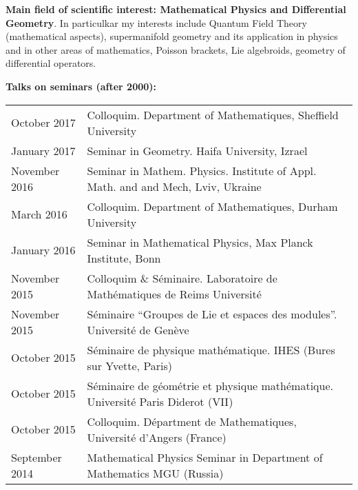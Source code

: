 \documentclass[12pt]{article}
\newcommand{\punkt}{\par\medskip\noindent}
\begin{document}
\medskip

   {\bf Main field of scientific interest: Mathematical Physics
   and Differential Geometry}. In particulkar  my interests 
  include Quantum Field Theory (mathematical aspects),
   supermanifold geometry and its application in physics and
  in other areas of mathematics, Poisson brackets, Lie algebroids,
geometry of differential operators.


 \punkt
 {\bf Talks on seminars (after 2000):}
 \par\smallskip\noindent
 \begin{tabular}{ll}

October  2017   &  Colloquim. Department of Mathematiques, 
Sheffield 
University \\


  January  2017   &  Seminar in Geometry.
 Haifa University, Izrael\\




November  2016   &  Seminar in Mathem. Physics.
 Institute of Appl. Math. and 
and Mech, Lviv, Ukraine \\



March  2016   &  Colloquim. Department of Mathematiques, Durham 
University \\


 January 2016   &Seminar in Mathematical Physics, Max Planck Institute, 
                      Bonn \\

 November 2015   & Colloquim \&
           S\'eminaire. Laboratoire 
        de Math\'ematiques de Reims 
             Universit\'e \\
 November 2015   & S\'eminaire ``Groupes de Lie et espaces des modules''.
             Universit\'e de Gen\`eve\\
 October 2015   & S\'eminaire de physique math\'ematique.
           IHES (Bures sur Yvette, Paris)\\
 
October 2015   & S\'eminaire de g\'eom\'etrie et physique math\'ematique.
           Universit\'e Paris Diderot (VII)\\
 
October 2015   &  Colloquim. D\'epartment de Mathematiques, Universit\'e 
d'Angers (France)\\


 September 2014 &Mathematical Physics Seminar in Department of Mathematics MGU
                                       (Russia)\\ 


\end{tabular}
\end{document}
